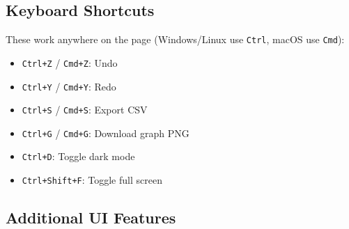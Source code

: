 \documentclass[12pt]{article}
\begin{document}
    \subsection{Keyboard Shortcuts}
    These work anywhere on the page (Windows/Linux use \texttt{Ctrl}, macOS use \texttt{Cmd}):

    \begin{itemize}
        \item \texttt{Ctrl+Z} / \texttt{Cmd+Z}: Undo
        \item \texttt{Ctrl+Y} / \texttt{Cmd+Y}: Redo
        \item \texttt{Ctrl+S} / \texttt{Cmd+S}: Export CSV
        \item \texttt{Ctrl+G} / \texttt{Cmd+G}: Download graph PNG
        \item \texttt{Ctrl+D}: Toggle dark mode
        \item \texttt{Ctrl+Shift+F}: Toggle full screen
    \end{itemize}

    \subsection{Additional UI Features}
\end{document}
